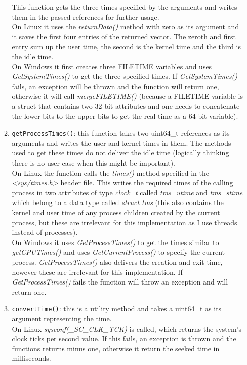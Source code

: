 \begin{enumerate}
\begin{enumerate}
\begin{enumerate}
		\end{enumerate}
		This function gets the three times specified by the arguments and writes them in the passed references for further usage.\\
		On Linux it uses the \textit{returnData()} method with zero as its argument and it saves the first four entries of the returned vector. The zeroth and first entry sum up the user time, the second is the kernel time and the third is the idle time.\\
		On Windows it first creates three FILETIME variables and uses \textit{GetSystemTimes()} to get the three specified times. If \textit{GetSystemTimes()} fails, an exception will be thrown and the function will return one, otherwise it will call \textit{mergeFILETIME()} (because a FILETIME variable is a struct that contains two 32-bit attributes and one needs to concatenate the lower bits to the upper bits to get the real time as a 64-bit variable).
		\item \texttt{getProcessTimes()}: this function takes two uint64\_t references as its arguments and writes the user and kernel times in them. The methods used to get these times do not deliver the idle time (logically thinking there is no user case when this might be important).\\
		On Linux the function calls the \textit{times()} method specified in the \textit{<sys/times.h>} header file. This writes the required times of the calling process in two attributes of type \textit{clock\_t} called \textit{tms\_utime} and \textit{tms\_stime} which belong to a  data type called \textit{struct tms} (this also contains the kernel and user time of any process children created by the current process, but these are irrelevant for this implementation as I use threads instead of processes).\\
		On Windows it uses \textit{GetProcessTimes()} to get the times similar to \textit{getCPUTimes()} and uses \textit{GetCurrentProcess()} to specify the current process. \textit{GetProcessTimes()} also delivers the creation and exit time, however these are irrelevant for this implementation. If \textit{GetProcessTimes()} fails the function will throw an exception and will return one.
		\item \texttt{convertTime()}: this is a utility method and takes a uint64\_t as its argument representing the time. \\
		On Linux \textit{sysconf(\_SC\_CLK\_TCK)} is called, which returns the system's clock ticks per second value. If this fails, an exception is thrown and the functions returns minus one, otherwise it return the seeked time in milliseconds.\\

\end{enumerate}
\end{enumerate}
